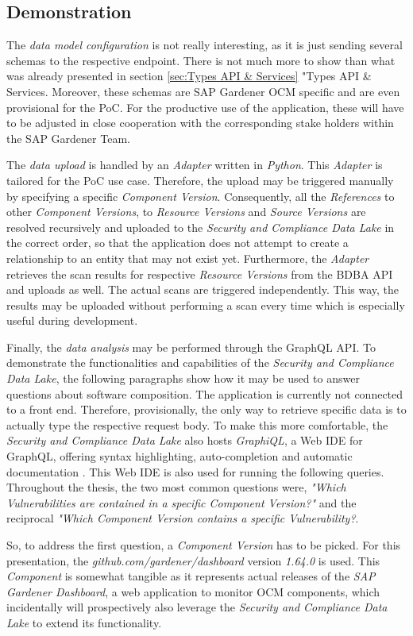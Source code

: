 \subsection{Demonstration}
The \emph{data model configuration} is not really interesting, as it is just sending several schemas to the respective endpoint. There is not much more to show than what was already presented in section \ref{sec:Types API & Services} "Types API \& Services. Moreover, these schemas are SAP Gardener OCM specific and are even provisional for the PoC. For the productive use of the application, these will have to be adjusted in close cooperation with the corresponding stake holders within the SAP Gardener Team.\par
The \emph{data upload} is handled by an \emph{Adapter} written in \emph{Python}. This \emph{Adapter} is tailored for the PoC use case. Therefore, the upload may be triggered manually by specifying a specific \emph{Component Version}. Consequently, all the \emph{References} to other \emph{Component Versions}, to \emph{Resource Versions} and  \emph{Source Versions} are resolved recursively and uploaded to the \emph{Security and Compliance Data Lake} in the correct order, so that the application does not attempt to create a relationship to an entity that may not exist yet. Furthermore, the \emph{Adapter} retrieves the scan results for respective \emph{Resource Versions} from the BDBA API and uploads as well. The actual scans are triggered independently. This way, the results may be uploaded without performing a scan every time which is especially useful during development.\par
Finally, the \emph{data analysis} may be performed through the GraphQL API. To demonstrate the functionalities and capabilities of the \emph{Security and Compliance Data Lake}, the following paragraphs show how it may be used to answer questions about software composition. The application is currently not connected to a front end. Therefore, provisionally, the only way to retrieve specific data is to actually type the respective request body. To make this more comfortable, the \emph{Security and Compliance Data Lake} also hosts \emph{GraphiQL}, a Web IDE for GraphQL, offering syntax highlighting, auto-completion and automatic documentation \cite{graphiql}. This Web IDE is also used for running the following queries.\\

Throughout the thesis, the two most common questions were, \emph{"Which Vulnerabilities are contained in a specific Component Version?"} and the reciprocal \emph{"Which Component Version contains a specific Vulnerability?}.\par
So, to address the first question, a \emph{Component Version} has to be picked. For this presentation, the \emph{github.com/gardener/dashboard} version \emph{1.64.0} is used. This \emph{Component} is somewhat tangible as it represents actual releases of the \emph{SAP Gardener Dashboard}, a web application to monitor OCM components, which incidentally will prospectively also leverage the \emph{Security and Compliance Data Lake} to extend its functionality.

